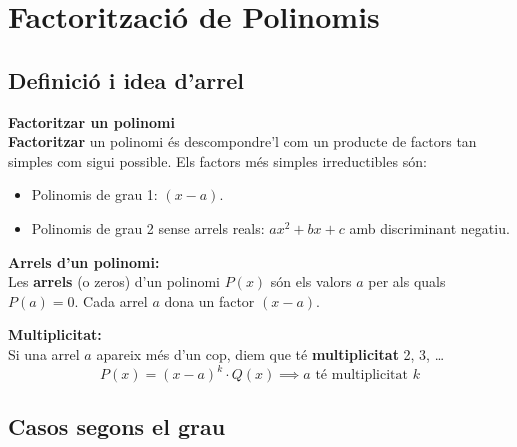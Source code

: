 \documentclass[12pt]{article}
\begin{document}
\newpage

\section{Factorització de Polinomis}

\subsection{Definició i idea d'arrel}

\begin{concept}
\textbf{Factoritzar un polinomi}\\
\textbf{Factoritzar} un polinomi és descompondre'l com un producte de factors tan simples com sigui possible. Els factors més simples irreductibles són:
\begin{itemize}
    \item Polinomis de grau 1: $(x-a)$.
    \item Polinomis de grau 2 sense arrels reals: $ax^2+bx+c$ amb discriminant negatiu.
\end{itemize}

\textbf{Arrels d'un polinomi:}\\
Les \textbf{arrels} (o zeros) d'un polinomi $P(x)$ són els valors $a$ per als quals $P(a)=0$. Cada arrel $a$ dona un factor $(x-a)$.

\textbf{Multiplicitat:}\\
Si una arrel $a$ apareix més d'un cop, diem que té \textbf{multiplicitat} 2, 3, \dots
\[
P(x) = (x-a)^k \cdot Q(x) \implies a \text{ té multiplicitat } k
\]
\end{concept}

\subsection{Casos segons el grau}
\end{document}
